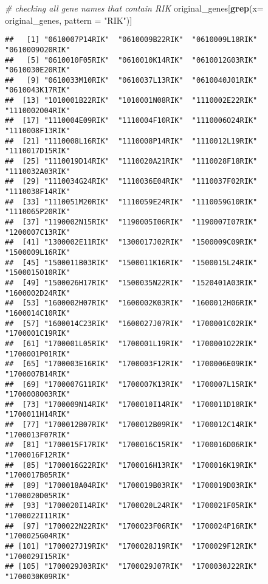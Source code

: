 \documentclass[
]{article}
\newenvironment{Shaded}{\begin{snugshade}}{\end{snugshade}}
\newcommand{\AttributeTok}[1]{\textcolor[rgb]{0.13,0.29,0.53}{#1}}
\newcommand{\CommentTok}[1]{\textcolor[rgb]{0.56,0.35,0.01}{\textit{#1}}}
\newcommand{\FunctionTok}[1]{\textcolor[rgb]{0.13,0.29,0.53}{\textbf{#1}}}
\newcommand{\NormalTok}[1]{#1}
\newcommand{\StringTok}[1]{\textcolor[rgb]{0.31,0.60,0.02}{#1}}
\begin{document}
\begin{Shaded}
\begin{Highlighting}[]
\CommentTok{\# checking all gene names that contain RIK}
\NormalTok{original\_genes[}\FunctionTok{grep}\NormalTok{(}\AttributeTok{x=}\NormalTok{ original\_genes, }\AttributeTok{pattern =} \StringTok{"RIK"}\NormalTok{)] }
\end{Highlighting}
\end{Shaded}

\begin{verbatim}
##   [1] "0610007P14RIK"  "0610009B22RIK"  "0610009L18RIK"  "0610009O20RIK" 
##   [5] "0610010F05RIK"  "0610010K14RIK"  "0610012G03RIK"  "0610030E20RIK" 
##   [9] "0610033M10RIK"  "0610037L13RIK"  "0610040J01RIK"  "0610043K17RIK" 
##  [13] "1010001B22RIK"  "1010001N08RIK"  "1110002E22RIK"  "1110002O04RIK" 
##  [17] "1110004E09RIK"  "1110004F10RIK"  "1110006O24RIK"  "1110008F13RIK" 
##  [21] "1110008L16RIK"  "1110008P14RIK"  "1110012L19RIK"  "1110017D15RIK" 
##  [25] "1110019D14RIK"  "1110020A21RIK"  "1110028F18RIK"  "1110032A03RIK" 
##  [29] "1110034G24RIK"  "1110036E04RIK"  "1110037F02RIK"  "1110038F14RIK" 
##  [33] "1110051M20RIK"  "1110059E24RIK"  "1110059G10RIK"  "1110065P20RIK" 
##  [37] "1190002N15RIK"  "1190005I06RIK"  "1190007I07RIK"  "1200007C13RIK" 
##  [41] "1300002E11RIK"  "1300017J02RIK"  "1500009C09RIK"  "1500009L16RIK" 
##  [45] "1500011B03RIK"  "1500011K16RIK"  "1500015L24RIK"  "1500015O10RIK" 
##  [49] "1500026H17RIK"  "1500035N22RIK"  "1520401A03RIK"  "1600002D24RIK" 
##  [53] "1600002H07RIK"  "1600002K03RIK"  "1600012H06RIK"  "1600014C10RIK" 
##  [57] "1600014C23RIK"  "1600027J07RIK"  "1700001C02RIK"  "1700001C19RIK" 
##  [61] "1700001L05RIK"  "1700001L19RIK"  "1700001O22RIK"  "1700001P01RIK" 
##  [65] "1700003E16RIK"  "1700003F12RIK"  "1700006E09RIK"  "1700007B14RIK" 
##  [69] "1700007G11RIK"  "1700007K13RIK"  "1700007L15RIK"  "1700008O03RIK" 
##  [73] "1700009N14RIK"  "1700010I14RIK"  "1700011D18RIK"  "1700011H14RIK" 
##  [77] "1700012B07RIK"  "1700012B09RIK"  "1700012C14RIK"  "1700013F07RIK" 
##  [81] "1700015F17RIK"  "1700016C15RIK"  "1700016D06RIK"  "1700016F12RIK" 
##  [85] "1700016G22RIK"  "1700016H13RIK"  "1700016K19RIK"  "1700017B05RIK" 
##  [89] "1700018A04RIK"  "1700019B03RIK"  "1700019D03RIK"  "1700020D05RIK" 
##  [93] "1700020I14RIK"  "1700020L24RIK"  "1700021F05RIK"  "1700022I11RIK" 
##  [97] "1700022N22RIK"  "1700023F06RIK"  "1700024P16RIK"  "1700025G04RIK" 
## [101] "1700027J19RIK"  "1700028J19RIK"  "1700029F12RIK"  "1700029I15RIK" 
## [105] "1700029J03RIK"  "1700029J07RIK"  "1700030J22RIK"  "1700030K09RIK" 

\end{verbatim}
\end{document}
